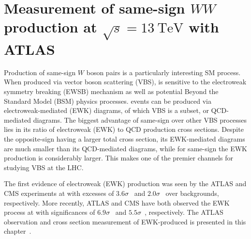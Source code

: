 \chapter[Measurement of same-sign $WW$ production at $\sqrt{s} = 13~\mathrm{TeV}$ with ATLAS][Measurement of same-sign $WW$ production at $\sqrt{s} = 13~\mathrm{TeV}$ with ATLAS]{Measurement of same-sign $WW$ production at $\sqrt{s} = 13~\mathrm{TeV}$ with ATLAS}
\label{ch:ssww13tev}
\setcounter{subsection}{0}

Production of same-sign $W$ boson pairs is a particularly interesting SM process.
When produced via vector boson scattering (VBS), \ssww is sensitive to the electroweak symmetry breaking (EWSB) mechanism as well as potential Beyond the Standard Model (BSM) physics processes.
\ssww events can be produced via electroweak-mediated (EWK) diagrams, of which VBS is a subset, or QCD-mediated diagrams. 
The biggest advantage of same-sign \ssww over other VBS processes lies in its ratio of electroweak (EWK) to QCD production cross sections.
Despite the opposite-sign \osww having a larger total cross section, its EWK-mediated diagrams are much smaller than its QCD-mediated diagrams, while for same-sign \sswwnojj the EWK production is considerably larger.
This makes \ssww one of the premier channels for studying VBS at the LHC.

The first evidence of electroweak (EWK) \ssww production was seen by the ATLAS and CMS experiments at  with excesses of $3.6\sigma$~\cite{2014.ssww-8tev-atlas} and $2.0\sigma$~\cite{2015.ssww-8tev-cms} over backgrounds, respectively.
More recently, ATLAS and CMS have both observed the EWK process at  with significances of $6.9\sigma$~\cite{2018.ssww-13tev-atlas-conf} and $5.5\sigma$~\cite{2017.ssww-13tev-cms}, respectively.
The ATLAS  observation and cross section measurement of EWK-produced \ssww is presented in this chapter~\cite{2018.ssww-13tev-paper-draft, 2018.ssww-13tev-atlas-support}.



